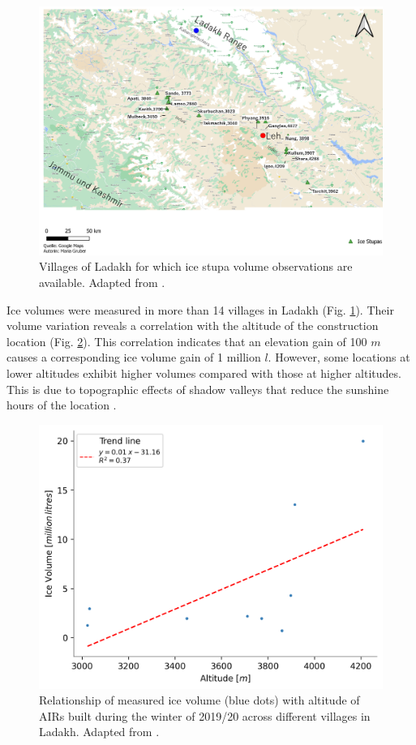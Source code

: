 \begin{figure}
	\includegraphics[width=\textwidth]{figs/ISC_villages}
	\caption{Villages of Ladakh for which ice stupa volume observations are available. Adapted from \citet{mariagruberIceStupasLadakh2022}.}
	\label{fig:villages}
\end{figure}

Ice volumes were measured in more than 14 villages in Ladakh (Fig. \ref{fig:villages}). Their volume variation
reveals a correlation with the altitude of the construction location (Fig. \ref{fig:altvsvol}). This correlation
indicates that an elevation gain of 100 $m$ causes a corresponding ice volume gain of 1 million $l$. However,
some locations at lower altitudes exhibit higher volumes compared with those at higher altitudes. This is due
to topographic effects of shadow valleys that reduce the sunshine hours of the location
\citep{mariagruberIceStupasLadakh2022}.

\begin{figure}
	\centering
	\includegraphics[width=\textwidth]{figs/altitudevsvolume.png}
	\caption{Relationship of measured ice volume (blue dots) with altitude of \ac{AIRs} built during the winter of 2019/20 across
		different villages in Ladakh. Adapted from \citet{mariagruberIceStupasLadakh2022}.}
	\label{fig:altvsvol}
\end{figure}

